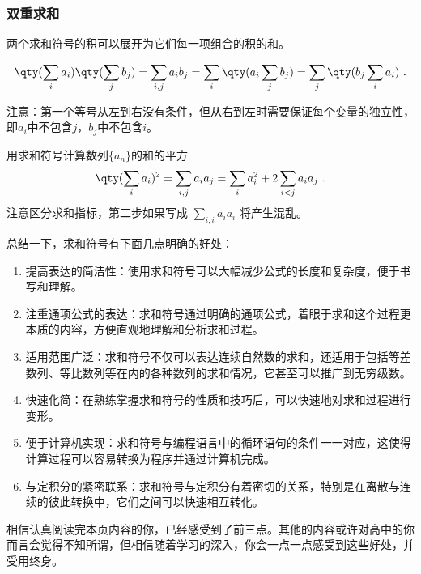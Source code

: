 \subsubsection{双重求和}
两个求和符号的积可以展开为它们每一项组合的积的和。

\begin{equation}
\qty(\sum_i a_i) \qty(\sum_j b_j) = \sum_{i,j} a_i b_j = \sum_i \qty(a_i \sum_j b_j) = \sum_j \qty(b_j \sum_i a_i)~.
\end{equation}

注意：第一个等号从左到右没有条件，但从右到左时需要保证每个变量的独立性，即$a_i$中不包含$j$，$b_j$中不包含$i$。

\begin{example}{用求和符号计算数列$\{a_n\}$的和的平方}
$$\qty(\sum_i a_i)^2 = \sum_{i,j} a_i a_j = \sum_i a_i^2 + 2\sum_{i<j} a_i a_j~.$$
注意区分求和指标，第二步如果写成 $\sum\limits_{i,i} a_i a_i$ 将产生混乱。
\end{example}

总结一下，求和符号有下面几点明确的好处：

\begin{enumerate}
\item 提高表达的简洁性：使用求和符号可以大幅减少公式的长度和复杂度，便于书写和理解。
\item 注重通项公式的表达：求和符号通过明确的通项公式，着眼于求和这个过程更本质的内容，方便直观地理解和分析求和过程。
\item 适用范围广泛：求和符号不仅可以表达连续自然数的求和，还适用于包括等差数列、等比数列等在内的各种数列的求和情况，它甚至可以推广到无穷级数。
\item 快速化简：在熟练掌握求和符号的性质和技巧后，可以快速地对求和过程进行变形。
\item 便于计算机实现：求和符号与编程语言中的循环语句的条件一一对应，这使得计算过程可以容易转换为程序并通过计算机完成。
\item 与定积分的紧密联系：求和符号与定积分有着密切的关系，特别是在离散与连续的彼此转换中，它们之间可以快速相互转化。
\end{enumerate}

相信认真阅读完本页内容的你，已经感受到了前三点。其他的内容或许对高中的你而言会觉得不知所谓，但相信随着学习的深入，你会一点一点感受到这些好处，并受用终身。